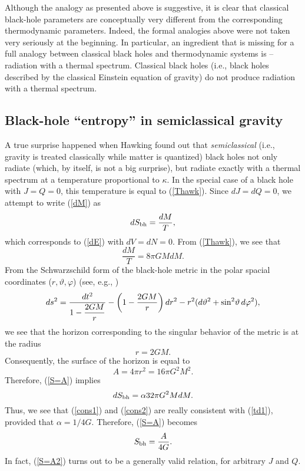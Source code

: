 \documentclass[12pt]{article}
\begin{document}
Although the analogy as presented above is suggestive, it is clear 
that classical black-hole parameters are conceptually very different 
from the corresponding thermodynamic parameters.    
Indeed, the formal analogies above 
were not taken very seriously at the beginning. In particular, 
an ingredient that is missing for a full analogy between classical 
black holes and thermodynamic systems is -- radiation 
with a thermal spectrum. Classical black holes
(i.e., black holes described by the classical Einstein
equation of gravity)
do not produce radiation with a thermal spectrum.

\subsection{Black-hole ``entropy'' in semiclassical gravity}

A true surprise happened when Hawking found out \cite{hawk} that
{\em semiclassical} (i.e., gravity is treated classically 
while matter is quantized) black holes  
not only radiate (which, by itself, 
is not a big surprise), but radiate exactly with a thermal spectrum 
at a temperature proportional to $\kappa$. In the special case of a 
black hole with $J=Q=0$, this temperature is equal to
(\ref{Thawk}). 
Since $dJ=dQ=0$, we attempt to write (\ref{dM}) as
 \begin{equation}\label{td1}
dS_{\rm bh}=\frac{dM}{T} ,
\end{equation}
which corresponds to (\ref{dE}) with $dV=dN=0$.
From (\ref{Thawk}), we see that
\begin{equation}\label{cons1}
\frac{dM}{T}=8\pi GMdM .
\end{equation}
From the Schwarzschild form of the black-hole metric in the 
polar spacial coordinates ($r,\vartheta,\varphi$) (see, e.g.,
\cite{carrol})
\begin{equation}
ds^2=\frac{dt^2}{1-\displaystyle\frac{2GM}{r}}
-\left( 1-\frac{2GM}{r} \right) dr^2 -r^2 (d\vartheta^2 +
{\rm sin}^2\vartheta \, d\varphi^2 ) ,
\end{equation}
we see that the horizon corresponding to the singular behavior 
of the metric is at the radius
\begin{equation}
r=2GM .
\end{equation}
Consequently, the surface of the horizon is equal to
\begin{equation}\label{bhpom}
A=4\pi r^2=16\pi G^2 M^2. 
\end{equation}
Therefore, (\ref{S=A}) implies
\begin{equation}\label{cons2}
dS_{\rm bh}=\alpha 32\pi G^2 MdM.
\end{equation}
Thus, we see that (\ref{cons1}) and (\ref{cons2}) are really 
consistent with (\ref{td1}), provided that $\alpha=1/4G$.
Therefore, (\ref{S=A}) becomes   
\begin{equation}\label{S=A2}
S_{\rm bh}=\frac{A}{4G} .
\end{equation}
In fact, (\ref{S=A2}) turns out to be a generally valid relation, 
for arbitrary $J$ and $Q$. 
\end{document}
